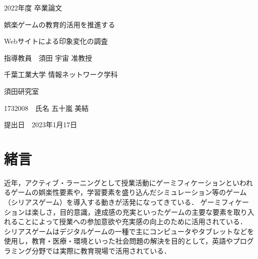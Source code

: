 \documentclass[12pt,a4j,titlepage]{ltjsarticle}
\begin{document}
\begin{titlepage}
  \centering
    \vspace*{40truept}
    {\LARGE 2022年度 卒業論文}
    
    \vspace*{75truept}
    
    {\Huge 娯楽ゲームの教育的活用を推進する}
\vspace*{10truept}

    {\Huge Webサイトによる印象変化の調査}%

    \vspace{85truept}
    
    {\LARGE 指導教員　須田 宇宙 准教授}
    
    \vspace{60truept}
    
    {\LARGE 千葉工業大学 情報ネットワーク学科}
    
    \vspace{15truept}
    
    {\LARGE 須田研究室}
    
    \vspace{70truept}
    
    {\LARGE 1732008　氏名 五十嵐 美結 }　%

    \vspace{70truept}
    
  \begin{flushright}

    \LARGE {提出日　2023年1月17日}
  
  \end{flushright}
\end{titlepage}
\date{}



\tableofcontents
\newpage
\listoftables
\newpage
\listoffigures
\newpage
\section{緒言}\label{緒言}

近年，アクティブ・ラーニングとして授業活動にゲーミフィケーションといわれるゲームの娯楽性要素や，学習要素を盛り込んだシミュレーション等のゲーム（シリアスゲーム）を導入する動きが活発になってきている．
ゲーミフィケーションは楽しさ，目的意識，達成感の充実といったゲームの主要な要素を取り入れることによって授業への参加意欲や充実感の向上のために活用されている．
シリアスゲームはデジタルゲームの一種で主にコンピュータやタブレットなどを使用し，教育・医療・環境といった社会問題の解決を目的として，英語やプログラミング分野では実際に教育現場で活用されている．
\end{document}
